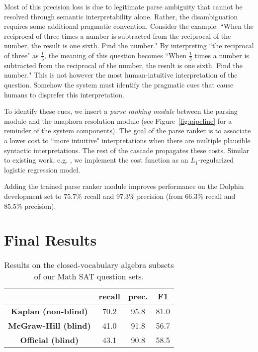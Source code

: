 \documentclass[11pt,letterpaper]{article}
\begin{document}
Most of this precision loss is due to legitimate parse ambiguity that cannot be resolved through semantic interpretability alone. Rather, the disambiguation requires some additional pragmatic convention. Consider the example: ``When the reciprocal of three times a number is subtracted from the reciprocal of the number, the result is one sixth. Find the number." By interpreting ``the reciprocal of three" as $\frac{1}{3}$, the meaning of this question becomes ``When $\frac{1}{3}$ times a number is subtracted from the reciprocal of the number, the result is one sixth. Find the number." This is not however the most human-intuitive interpretation of the question. Somehow the system must identify the pragmatic cues that cause humans to disprefer this interpretation.

To identify these cues, we insert a \emph{parse ranking module} between the parsing module and the anaphora resolution module (see Figure~\ref{fig:pipeline} for a reminder of the system components). The goal of the parse ranker is to associate a lower cost to ``more intuitive" interpretations when there are multiple plausible syntactic interpretations. The rest of the cascade propagates these costs. Similar to existing work, e.g. \cite{charniak2005coarse}, we implement the cost function as an $L_1$-regularized logistic regression model.

Adding the trained parse ranker module improves performance on the Dolphin development set to 75.7\% recall and 97.3\% precision (from 66.3\% recall and 85.5\% precision). 

\section{Final Results}

\begin{table}[tb]
\begin{center}
\begin{tabular}{|c||c|c|c|}
\hline
& \textbf{recall} & \textbf{prec.} & \textbf{F1} \\
\hline
\textbf{Kaplan (non-blind)} & 70.2 & 95.8 & 81.0 \\
\textbf{McGraw-Hill (blind)} & 41.0 & 91.8 & 56.7 \\
\textbf{Official (blind)} & 43.1 & 90.8 & 58.5  \\
\hline
\end{tabular}
\end{center}
\caption{\label{tab:results} Results on the closed-vocabulary algebra subsets of our Math SAT question sets.}
\end{table}
\end{document}
